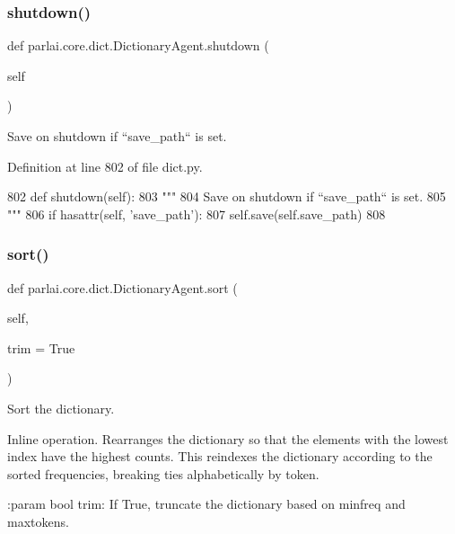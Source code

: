 \subsubsection{\texorpdfstring{shutdown()}{shutdown()}}
{\footnotesize\ttfamily def parlai.\+core.\+dict.\+Dictionary\+Agent.\+shutdown (\begin{DoxyParamCaption}\item[{}]{self }\end{DoxyParamCaption})}

\begin{DoxyVerb}Save on shutdown if ``save_path`` is set.
\end{DoxyVerb}
 

Definition at line 802 of file dict.\+py.


\begin{DoxyCode}
802     \textcolor{keyword}{def }shutdown(self):
803         \textcolor{stringliteral}{"""}
804 \textcolor{stringliteral}{        Save on shutdown if ``save\_path`` is set.}
805 \textcolor{stringliteral}{        """}
806         \textcolor{keywordflow}{if} hasattr(self, \textcolor{stringliteral}{'save\_path'}):
807             self.save(self.save\_path)
808 
\end{DoxyCode}
\mbox{\label{classparlai_1_1core_1_1dict_1_1DictionaryAgent_a84cb4fabf5d0e92e3f80ac16bdfd0ccc}} 
\subsubsection{\texorpdfstring{sort()}{sort()}}
{\footnotesize\ttfamily def parlai.\+core.\+dict.\+Dictionary\+Agent.\+sort (\begin{DoxyParamCaption}\item[{}]{self,  }\item[{}]{trim = {\ttfamily True} }\end{DoxyParamCaption})}

\begin{DoxyVerb}Sort the dictionary.

Inline operation. Rearranges the dictionary so that the elements with
the lowest index have the highest counts. This reindexes the dictionary
according to the sorted frequencies, breaking ties alphabetically by
token.

:param bool trim:
    If True, truncate the dictionary based on minfreq and maxtokens.
\end{DoxyVerb}
 

